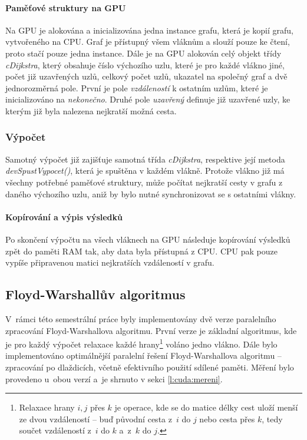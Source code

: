 \paragraph{Paměťové struktury na GPU}
Na GPU je alokována a inicializována jedna instance grafu, která je kopií grafu, vytvořeného na CPU. Graf je přístupný všem vláknům a slouží pouze ke čtení, proto stačí pouze jedna instance. Dále je na GPU alokován celý objekt třídy \textit{cDijkstra}, který obsahuje číslo výchozího uzlu, které je pro každé vlákno jiné, počet již uzavřených uzlů, celkový počet uzlů, ukazatel na společný graf a dvě jednorozměrná pole. První je pole \textit{vzdáleností} k ostatním uzlům, které je inicializováno na \textit{nekonečno}. Druhé pole \textit{uzavřený} definuje již uzavřené uzly, ke kterým již byla nalezena nejkratší možná cesta.

\subsubsection{Výpočet}
Samotný výpočet již zajišťuje samotná třída \textit{cDijkstra}, respektive její metoda \textit{devSpustVypocet()}, která je spuštěna v každém vlákně. Protože vlákno již má všechny potřebné paměťové struktury, může počítat nejkratší cesty v grafu z daného výchozího uzlu, aniž by bylo nutné synchronizovat se s ostatními vlákny.

\paragraph{Kopírování a výpis výsledků}
Po skončení výpočtu na všech vláknech na GPU následuje kopírování výsledků zpět do paměti RAM tak, aby data byla přístupná z CPU. CPU pak pouze vypíše připravenou matici nejkratších vzdáleností v grafu.






\subsection{Floyd-Warshallův algoritmus}
V~rámci této semestrální práce byly implementovány dvě verze paralelního zpracování Floyd-Warshallova algoritmu. 
První verze je základní algoritmus, kde je pro každý výpočet relaxace každé hrany\footnote{Relaxace hrany $i,j$ přes $k$ je operace, 
kde se do matice délky cest uloží menší ze dvou vzdáleností -- buď původní cesta z~$i$ do $j$ nebo cesta
přes $k$, tedy součet vzdáleností z~$i$ do $k$ a~z~$k$ do $j$.} voláno jedno vlákno. Dále bylo implementováno 
optimálnější paralelní řešení Floyd-Warshallova algoritmu -- zpracování po dlaždicích, včetně efektivního použití sdílené paměti.
Měření bylo provedeno u~obou verzí a~je shrnuto v sekci \ref{l:cuda:mereni}.


